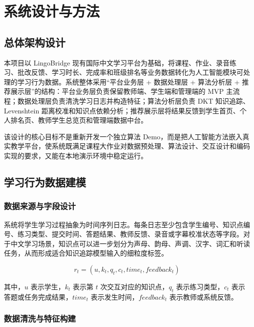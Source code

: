 
\chapter{系统设计与方法}

\section{总体架构设计}

本项目以 LingoBridge 现有国际中文学习平台为基础，将课程、作业、录音练习、批改反馈、学习时长、完成率和班级排名等业务数据转化为人工智能模块可处理的学习行为数据。系统整体采用“平台业务层 + 数据处理层 + 算法分析层 + 推荐展示层”的结构：平台业务层负责保留教师端、学生端和管理端的 MVP 主流程；数据处理层负责清洗学习日志并构造特征；算法分析层负责 DKT 知识追踪、Levenshtein 距离校准和知识点依赖分析；推荐展示层将结果反馈到学生首页、个人排名页、教师学生总览页和管理端数据中台。

该设计的核心目标不是重新开发一个独立算法 Demo，而是把人工智能方法嵌入真实教学平台，使系统既满足课程大作业对数据预处理、算法设计、交互设计和编码实现的要求，又能在本地演示环境中稳定运行。

\section{学习行为数据建模}

\subsection{数据来源与字段设计}

系统将学生学习过程抽象为时间序列日志。每条日志至少包含学生编号、知识点编号、练习类型、提交时间、答题结果、教师反馈、录音或字幕校准状态等字段。对于中文学习场景，知识点可以进一步划分为声母、韵母、声调、汉字、词汇和听读任务，从而形成适合知识追踪模型输入的细粒度标签。

\begin{equation}
r_t = (u, k_t, q_t, c_t, time_t, feedback_t)
\end{equation}

其中，$u$ 表示学生，$k_t$ 表示第 $t$ 次交互对应的知识点，$q_t$ 表示练习类型，$c_t$ 表示答题或任务完成结果，$time_t$ 表示发生时间，$feedback_t$ 表示教师或系统反馈。

\subsection{数据清洗与特征构建}

